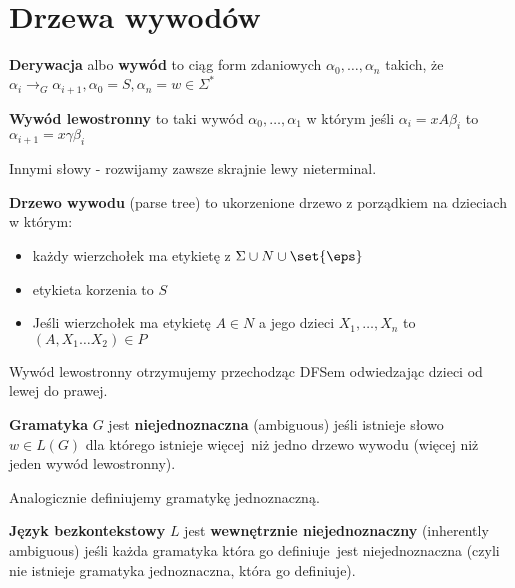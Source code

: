 \section{Drzewa wywodów}

\begin{definition}
    \textbf{Derywacja} albo \textbf{wywód} to ciąg form zdaniowych \( \alpha_0, \dots, \alpha_n \)
    takich, że \( \alpha_i \rightarrow_G \alpha_{i+1}, \alpha_0 = S, \alpha_n = w \in \Sigma^*\)
\end{definition}
\begin{definition}
    \textbf{Wywód lewostronny} to taki wywód \( \alpha_0, \dots, \alpha_1 \)
    w którym jeśli \( \alpha_i = xA\beta_i \)
    to \( \alpha_{i+1} = x\gamma\beta_i \)
    
    Innymi słowy - rozwijamy zawsze skrajnie lewy nieterminal.
\end{definition}

\begin{definition}
    \textbf{Drzewo wywodu} (parse tree) to ukorzenione drzewo z porządkiem na dzieciach w którym:
    \begin{itemize}
        \item każdy wierzchołek ma etykietę z \( \Sigma \cup N \cup \set{\eps} \)
        \item etykieta korzenia to \( S \)
        \item Jeśli wierzchołek ma etykietę \( A \in N \) a jego dzieci \( X_1, \dots, X_n \) to \( (A, X_1\dots X_2) \in P \)
    \end{itemize}
\end{definition}
Wywód lewostronny otrzymujemy przechodząc DFSem odwiedzając dzieci od lewej do prawej.

\begin{definition}
    \textbf{Gramatyka} \( G \) jest \textbf{niejednoznaczna} (ambiguous) jeśli istnieje słowo \( w \in L(G) \) dla którego istnieje więcej\
    niż jedno drzewo wywodu (więcej niż jeden wywód lewostronny).
\end{definition}

Analogicznie definiujemy gramatykę jednoznaczną.

\begin{definition}
    \textbf{Język bezkontekstowy} \(L\) jest \textbf{wewnętrznie niejednoznaczny} (inherently ambiguous) jeśli każda gramatyka która go definiuje\
    jest niejednoznaczna (czyli nie istnieje gramatyka jednoznaczna, która go definiuje).
\end{definition}